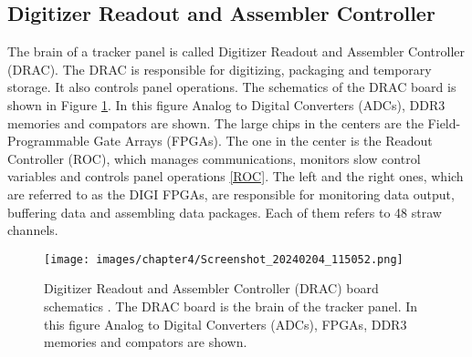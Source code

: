\subsection{Digitizer Readout and Assembler Controller}
The brain of a tracker panel is called Digitizer Readout and Assembler Controller (DRAC). The DRAC is responsible for digitizing, packaging and temporary storage. It also controls panel operations. The schematics of the DRAC board is shown in Figure \ref{fig:drac}. In this figure Analog to Digital Converters (ADCs), DDR3 memories and compators are shown. The large chips in the centers are the Field-Programmable Gate Arrays (FPGAs). The one in the center is the Readout Controller (ROC), which manages communications, monitors slow control variables and controls panel operations \ref{ROC}. The left and the right ones, which are referred to as the DIGI FPGAs, are responsible for monitoring data output, buffering data and assembling data packages. Each of them refers to 48 straw channels. 
\begin{figure}[!h]
\centering
\texttt{[image: images/chapter4/Screenshot\_20240204\_115052.png]}
\caption{Digitizer Readout and Assembler Controller (DRAC) board schematics \cite{drac}. The DRAC board is the brain of the tracker panel. In this figure Analog to Digital Converters (ADCs), FPGAs, DDR3 memories and compators are shown.}
\label{fig:drac}
\end{figure}
